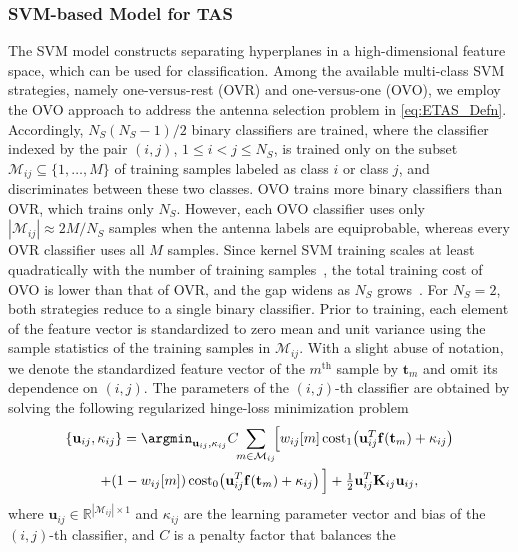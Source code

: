 \subsubsection{SVM-based Model for TAS}
\label{subsubsec:svm}
{\color{blue}
The SVM model constructs separating hyperplanes in a high-dimensional
feature space, which can be used for classification. Among the available
multi-class SVM strategies, namely one-versus-rest (OVR) and one-versus-one
(OVO), we employ the OVO approach to address the antenna selection
problem in \eqref{eq:ETAS_Defn}. Accordingly, $N_S(N_S-1)/2$ binary
classifiers are trained, where the classifier indexed by the pair
$(i,j)$, $1\leq i<j\leq N_S$, is trained only on the subset
$\mathcal{M}_{ij}\subseteq\{1,\dots,M\}$ of training samples labeled as
class $i$ or class $j$, and discriminates between these two classes.
OVO trains more binary classifiers than OVR, which trains only $N_S$.
However, each OVO classifier uses only $|\mathcal{M}_{ij}|\approx 2M/N_S$
samples when the antenna labels are equiprobable, whereas every OVR
classifier uses all $M$ samples. Since kernel SVM training scales at
least quadratically with the number of training
samples~\cite{Bottou_Lin_2007_LSKM}, the total training cost of OVO is
lower than that of OVR, and the gap widens as $N_S$
grows~\cite{Hsu_Lin_2002_TNN}. For $N_S=2$, both strategies reduce to a
single binary classifier.
Prior to training, each element of the feature vector is standardized to
zero mean and unit variance using the sample statistics of the training
samples in $\mathcal{M}_{ij}$. With a slight abuse of notation, we denote
the standardized feature vector of the $m^{\text{th}}$ sample by
$\mathbf{t}_m$ and omit its dependence on $(i,j)$. The parameters of the
$(i,j)$-th classifier are obtained by solving the following regularized
hinge-loss minimization problem~\cite{He_2018_wcLet,Hsu_Lin_2002_TNN}
\begin{multline}\label{eq:SVM}
\{\mathbf{u}_{ij},\kappa_{ij}\} = \argmin_{\mathbf{u}_{ij},\kappa_{ij}}
C \!\!\sum_{m\in\mathcal{M}_{ij}}\!\! \Big[ w_{ij}[m]\,\text{cost}_1\!\left(\mathbf{u}_{ij}^T \mathbf{f}(\mathbf{t}_m)+\kappa_{ij}\right) \\
 + (1-w_{ij}[m])\,\text{cost}_0\!\left(\mathbf{u}_{ij}^T \mathbf{f}(\mathbf{t}_m)+\kappa_{ij}\right) \Big]
+ \tfrac{1}{2}\mathbf{u}_{ij}^T\mathbf{K}_{ij}\mathbf{u}_{ij},
\end{multline}
where $\mathbf{u}_{ij}\in\mathbb{R}^{|\mathcal{M}_{ij}|\times 1}$ and
$\kappa_{ij}$ are the learning parameter vector and bias of the
$(i,j)$-th classifier, and $C$ is a penalty factor that balances the
}

